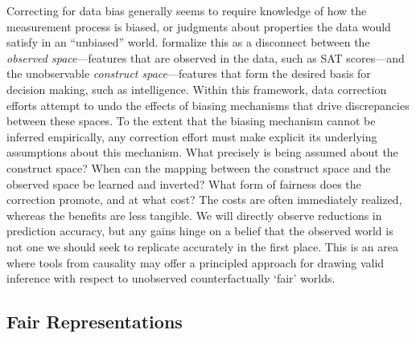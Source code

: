 Correcting for data bias generally seems to require knowledge of how the measurement process is biased, or judgments about properties the data would satisfy in an ``unbiased'' world.  \cite{friedler2016possibility} formalize this as a disconnect between the \emph{observed space}---features that are observed in the data, such as SAT scores---and the unobservable \emph{construct space}---features that form the desired basis for decision making, such as intelligence.  Within this framework, data correction efforts attempt to undo the effects of biasing mechanisms that drive discrepancies between these spaces.  To the extent that the biasing mechanism cannot be inferred empirically, any correction effort must make explicit its underlying assumptions about this mechanism.  What precisely is being assumed about the construct space? When can the mapping between the construct space and the observed space be learned and inverted? What form of fairness does the correction promote, and at what cost?  The costs are often immediately realized, whereas the benefits are less tangible.  We will directly observe reductions in prediction accuracy, but any gains hinge on a belief that the observed world is not one we should seek to replicate accurately in the first place.  This is an area where tools from causality may offer a principled approach for drawing valid inference with respect to unobserved counterfactually `fair' worlds.







\subsection{Fair Representations}

